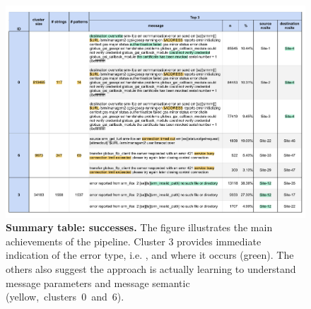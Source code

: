 \begin{landscape}
\begin{figure}
    \centering
    \includegraphics[width=\linewidth]{figures/510_results/cluster-summary-successes_annotated_printed.pdf}
    \caption{\textbf{Summary table: successes.}
    The figure illustrates the main achievements of the pipeline. 
    Cluster 3 provides immediate indication of the error type, i.e. , and where it occurs (green).
    The others also suggest the approach is actually learning to understand message parameters and message semantic \mbox{(yellow, clusters 0 and 6).}
    }
    \label{fig:cluster_summary:successes}
\end{figure}
\end{landscape}

